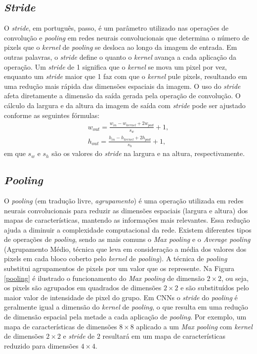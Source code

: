 \subsection{\textit{Stride}}
\label{sec:stride}
O \textit{stride}, em português, passo, é um parâmetro utilizado nas operações de convolução e \textit{pooling} em redes neurais convolucionais que determina o número de pixels que o \textit{kernel}  de \textit{pooling} se desloca ao longo da imagem de entrada. Em outras palavras, o \textit{stride} define o quanto o \textit{kernel} avança a cada aplicação da operação. Um \textit{stride} de 1 significa que o \textit{kernel} se mova um pixel por vez, enquanto um \textit{stride} maior que 1 faz com que o \textit{kernel} pule pixels, resultando em uma redução mais rápida das dimensões espaciais da imagem. O uso do \textit{stride} afeta diretamente a dimensão da saída gerada pela operação de convolução. O cálculo da largura e da altura da imagem de saída com \textit{stride} pode ser ajustado conforme as seguintes fórmulas:
\begin{equation}
    \begin{split}
    \label{largura_stride}
    w_{out} = \frac{w_{in} - w_{kernel} + 2w_{pad}}{s_w} +1,\\
    h_{out} = \frac{h_{in} - h_{kernel} + 2h_{pad}}{s_h} +1,
    \end{split}
\end{equation}
em que $s_w$ e $s_h$ são os valores do \textit{stride} na largura e na altura, respectivamente.


\subsection{\textit{Pooling}}
\label{sec:pooling}
O \textit{pooling} (em tradução livre, \textit{agrupamento}) é uma operação utilizada em redes neurais convolucionais para reduzir as dimensões espaciais (largura e altura) dos mapas de características, mantendo as informações mais relevantes. Essa redução ajuda a diminuir a complexidade computacional da rede. Existem diferentes tipos de operações de \textit{pooling}, sendo as mais comuns o \textit{Max pooling} e o \textit{Average pooling} (Agrupamento Médio, técnica que leva em consideração a média dos valores dos pixels em cada bloco coberto pelo \textit{kernel} de \textit{pooling}). A técnica de \textit{pooling} substitui agrupamentos de pixels por um valor que os represente. Na Figura \ref{pooling} é ilustrado o funcionamento do \textit{Max pooling} de dimensão $2 \times 2$, ou seja, os pixels são agrupados em quadrados de dimensões $2 \times 2$ e são substituídos pelo maior valor de intensidade de pixel do grupo. Em CNNs o \textit{stride} do \textit{pooling} é geralmente igual a dimensão do \textit{kernel} de \textit{pooling}, o que resulta em uma redução de dimensão espacial pela metade a cada aplicação de \textit{pooling}. Por exemplo, um mapa de características de dimensões $8\times 8$ aplicado a um \textit{Max pooling} com \textit{kernel} de dimensões $2\times 2$ e \textit{stride} de $2$ resultará em um mapa de características reduzido para dimensões $4\times 4$.

